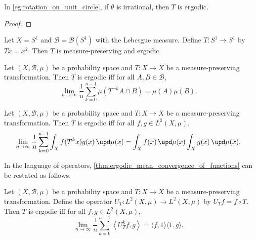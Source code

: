     \begin{proposition}\label{prop:irrational_rotation_is_ergodic}
        In \cref{eg:rotation_on_unit_circle}, if \(\theta\) is irrational, then \(T\) is ergodic.
    \end{proposition}
    \begin{proof}
    \end{proof}

    \begin{example}\label{eg:power_map_on_unit_circle_is_ergodic}
        Let \(X = S^1\) and \(\mathcal{B} = \mathcal{B}(S^1)\) with the Lebesgue measure.
        Define \(T:S^1 \to S^1\) by \(Tx = x^2\).
        Then \(T\) is measure-preserving and ergodic.

    \end{example}

    \begin{proposition}\label{prop:ergodic_mean_convergence_of_sets}
        Let \((X, \mathcal{B}, \mu)\) be a probability space and \(T:X\to X\) be a measure-preserving transformation.
        Then \(T\) is ergodic iff for all \(A, B \in \mathcal{B}\),
        \[
            \lim_{n\to \infty} \frac{1}{n} \sum_{k=0}^{n-1} \mu(T^{-k}A \cap B) = \mu(A) \mu(B).
        \]
    \end{proposition}

    \begin{theorem}\label{thm:ergodic_mean_convergence_of_functions}
        Let \((X, \mathcal{B}, \mu)\) be a probability space and \(T:X\to X\) be a measure-preserving transformation.
        Then \(T\) is ergodic iff for all \(f, g \in L^2(X, \mu)\),
        \[
            \lim_{n\to \infty} \frac{1}{n} \sum_{k=0}^{n-1} \int_X f(T^k x) g(x) \, \upd\mu(x) = \int_X f(x) \, \upd\mu(x) \int_X g(x) \, \upd\mu(x).
        \]
    \end{theorem}

    In the language of operators, \cref{thm:ergodic_mean_convergence_of_functions} can be restated as follows.
    \begin{corollary}\label{cor:ergodic_mean_convergence_of_operators}
        Let \((X, \mathcal{B}, \mu)\) be a probability space and \(T:X\to X\) be a measure-preserving transformation.
        Define the operator \(U_T:L^2(X, \mu) \to L^2(X, \mu)\) by \(U_T f = f \circ T\).
        Then \(T\) is ergodic iff for all \(f, g \in L^2(X, \mu)\),
        \[
            \lim_{n\to \infty} \frac{1}{n} \sum_{k=0}^{n-1} \left\langle U_T^k f, g \right\rangle = \langle f, 1 \rangle \langle 1, g \rangle.
        \]
    \end{corollary}

